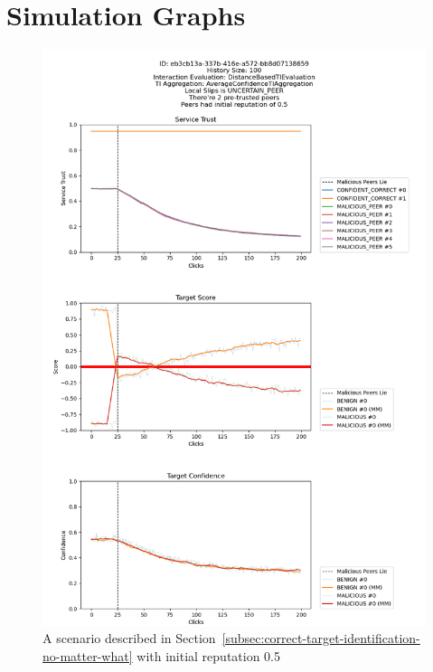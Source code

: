 \appendix
\chapter{Simulation Graphs}

\begin{figure}
    \centering
    \includegraphics[width=1.0\textwidth]{assets/miss_classification_recovery.png}
    \caption{A scenario described in Section~\ref{subsec:correct-target-identification-no-matter-what} with initial reputation 0.5}
    \label{fig:missclassification-recovery}
\end{figure}

